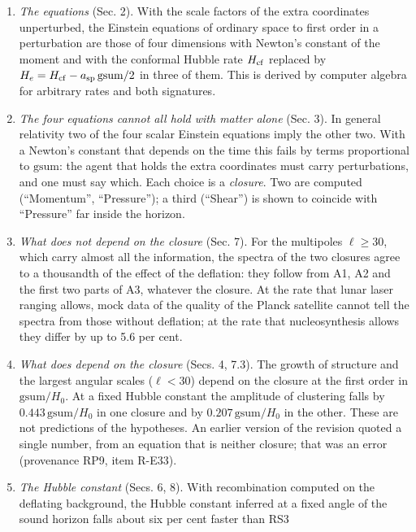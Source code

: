 \documentclass[
  10pt,
]{article}
\providecommand{\tightlist}{%
  \setlength{\itemsep}{0pt}\setlength{\parskip}{0pt}}
\begin{document}
\begin{enumerate}
\def\labelenumi{\arabic{enumi}.}
\tightlist
\item
  \emph{The equations} (Sec. 2). With the scale factors of the extra
  coordinates unperturbed, the Einstein equations of ordinary space to
  first order in a perturbation are those of four dimensions with
  Newton's constant of the moment and with the conformal Hubble rate
  \(H_{\rm cf}\) replaced by
  \(H_e=H_{\rm cf}-a_{\rm sp}\,\mathrm{gsum}/2\) in three of them. This
  is derived by computer algebra for arbitrary rates and both
  signatures.
\item
  \emph{The four equations cannot all hold with matter alone} (Sec. 3).
  In general relativity two of the four scalar Einstein equations imply
  the other two. With a Newton's constant that depends on the time this
  fails by terms proportional to \(\mathrm{gsum}\): the agent that holds
  the extra coordinates must carry perturbations, and one must say
  which. Each choice is a \emph{closure}. Two are computed
  (``Momentum'', ``Pressure''); a third (``Shear'') is shown to coincide
  with ``Pressure'' far inside the horizon.
\item
  \emph{What does not depend on the closure} (Sec. 7). For the
  multipoles \(\ell\ge30\), which carry almost all the information, the
  spectra of the two closures agree to a thousandth of the effect of the
  deflation: they follow from A1, A2 and the first two parts of A3,
  whatever the closure. At the rate that lunar laser ranging allows,
  mock data of the quality of the Planck satellite cannot tell the
  spectra from those without deflation; at the rate that nucleosynthesis
  allows they differ by up to 5.6 per cent.
\item
  \emph{What does depend on the closure} (Secs. 4, 7.3). The growth of
  structure and the largest angular scales (\(\ell<30\)) depend on the
  closure at the first order in \(\mathrm{gsum}/H_0\). At a fixed Hubble
  constant the amplitude of clustering falls by
  \(0.443\,\mathrm{gsum}/H_0\) in one closure and by
  \(0.207\,\mathrm{gsum}/H_0\) in the other. These are not predictions
  of the hypotheses. An earlier version of the revision quoted a single
  number, from an equation that is neither closure; that was an error
  (provenance RP9, item R-E33).
\item
  \emph{The Hubble constant} (Secs. 6, 8). With recombination computed
  on the deflating background, the Hubble constant inferred at a fixed
  angle of the sound horizon falls about six per cent faster than RS3

\end{enumerate}
\end{document}
